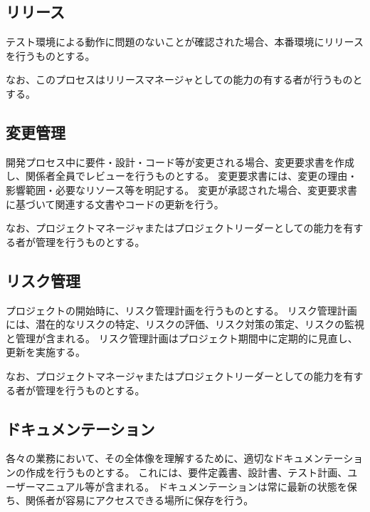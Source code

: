 \subsection{リリース}
テスト環境による動作に問題のないことが確認された場合、本番環境にリリースを行うものとする。

なお、このプロセスはリリースマネージャとしての能力の有する者が行うものとする。

\subsection{変更管理}
開発プロセス中に要件・設計・コード等が変更される場合、変更要求書を作成し、関係者全員でレビューを行うものとする。
変更要求書には、変更の理由・影響範囲・必要なリソース等を明記する。
変更が承認された場合、変更要求書に基づいて関連する文書やコードの更新を行う。

なお、プロジェクトマネージャまたはプロジェクトリーダーとしての能力を有する者が管理を行うものとする。

\subsection{リスク管理}
プロジェクトの開始時に、リスク管理計画を行うものとする。
リスク管理計画には、潜在的なリスクの特定、リスクの評価、リスク対策の策定、リスクの監視と管理が含まれる。
リスク管理計画はプロジェクト期間中に定期的に見直し、更新を実施する。

なお、プロジェクトマネージャまたはプロジェクトリーダーとしての能力を有する者が管理を行うものとする。

\subsection{ドキュメンテーション}
各々の業務において、その全体像を理解するために、適切なドキュメンテーションの作成を行うものとする。
これには、要件定義書、設計書、テスト計画、ユーザーマニュアル等が含まれる。
ドキュメンテーションは常に最新の状態を保ち、関係者が容易にアクセスできる場所に保存を行う。

